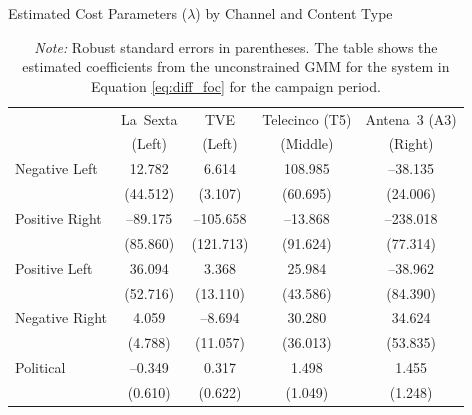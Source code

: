 \documentclass[12pt]{article}
\begin{document}




\begin{table}[!htbp]
	\caption{Estimated Cost Parameters ($\lambda$) by Channel and Content Type}
	\label{tab:costs}
	\centering\small
	\begin{tabular}{lcccc}
		\toprule
		& La~Sexta & TVE & Telecinco (T5) & Antena~3 (A3)\\
	& 	\scriptsize{(Left)} & \scriptsize{(Left)} & \scriptsize{(Middle)}& \scriptsize(Right) \\
		\midrule
		Negative Left   
		& 12.782   &  6.614   & 108.985   & --38.135  \\
		& (44.512) & (3.107)  & (60.695)  & (24.006)  \\
				\midrule
		Positive Right  
		& --89.175 & --105.658 & --13.868  & --238.018 \\
		& (85.860) & (121.713) & (91.624)  & (77.314)  \\
		\midrule
		Positive Left   
		& 36.094   &  3.368   &  25.984   & --38.962  \\
		& (52.716) & (13.110) & (43.586)  & (84.390)  \\
				\midrule
		Negative Right  
		&  4.059   & --8.694  &  30.280   &  34.624   \\
		& (4.788)  & (11.057) & (36.013)  & (53.835)  \\
		\midrule
		Political 
		& --0.349  &  0.317   &   1.498   &   1.455   \\
		& (0.610)  & (0.622)  &  (1.049)  &  (1.248)  \\
		\bottomrule
	\end{tabular}
	\vspace{0.5em}
	\caption*{\small \emph{Note:} Robust standard errors in parentheses. The table shows the estimated coefficients from the unconstrained GMM for the system in Equation \ref{eq:diff_foc} for the campaign period.}
\end{table}


\end{document}
